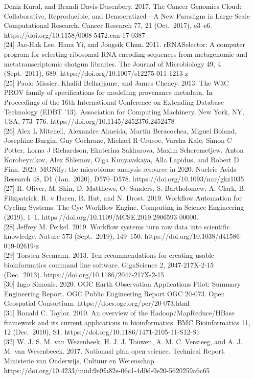 \documentclass[
]{article}
\begin{document}
Deniz Kural, and Brandi Davis-Dusenbery. 2017. The Cancer Genomics
Cloud: Collaborative, Reproducible, and Democratized---A New Paradigm in
Large-Scale Computational Research. Cancer Research 77, 21 (Oct.~2017),
e3--e6. https://doi.org/10.1158/0008-5472.can-17-0387\\
{[}24{]} Jae-Hak Lee, Hana Yi, and Jongsik Chun. 2011. rRNASelector: A
computer program for selecting ribosomal RNA encoding sequences from
metagenomic and metatranscriptomic shotgun libraries. The Journal of
Microbiology 49, 4 (Sept.~2011), 689.
https://doi.org/10.1007/s12275-011-1213-z\\
{[}25{]} Paolo Missier, Khalid Belhajjame, and James Cheney. 2013. The
W3C PROV family of specifications for modelling provenance metadata. In
Proceedings of the 16th International Conference on Extending Database
Technology (EDBT '13). Association for Computing Machinery, New York,
NY, USA, 773--776. https://doi.org/10.1145/2452376.2452478\\
{[}26{]} Alex L Mitchell, Alexandre Almeida, Martin Beracochea, Miguel
Boland, Josephine Burgin, Guy Cochrane, Michael R Crusoe, Varsha Kale,
Simon C Potter, Lorna J Richardson, Ekaterina Sakharova, Maxim
Scheremetjew, Anton Korobeynikov, Alex Shlemov, Olga Kunyavskaya, Alla
Lapidus, and Robert D Finn. 2020. MGNify: the microbiome analysis
resource in 2020. Nucleic Acids Research 48, D1 (Jan.~2020), D570--D578.
https://doi.org/10.1093/nar/gkz1035\\
{[}27{]} H. Oliver, M. Shin, D. Matthews, O. Sanders, S. Bartholomew, A.
Clark, B. Fitzpatrick, R. v Haren, R. Hut, and N. Drost. 2019. Workflow
Automation for Cycling Systems: The Cyc Workflow Engine. Computing in
Science Engineering (2019), 1--1.
https://doi.org/10.1109/MCSE.2019.2906593 00000.\\
{[}28{]} Jeffrey M. Perkel. 2019. Workflow systems turn raw data into
scientific knowledge. Nature 573 (Sept.~2019), 149--150.
https://doi.org/10.1038/d41586-019-02619-z\\
{[}29{]} Torsten Seemann. 2013. Ten recommendations for creating usable
bioinformatics command line software. GigaScience 2, 2047-217X-2-15
(Dec.~2013). https://doi.org/10.1186/2047-217X-2-15\\
{[}30{]} Ingo Simonis. 2020. OGC Earth Observation Applications Pilot:
Summary Engineering Report. OGC Public Engineering Report OGC 20-073.
Open Geospatial Consortium. https://docs.ogc.org/per/20-073.html\\
{[}31{]} Ronald C. Taylor. 2010. An overview of the
Hadoop/MapReduce/HBase framework and its current applications in
bioinformatics. BMC Bioinformatics 11, 12 (Dec.~2010), S1.
https://doi.org/10.1186/1471-2105-11-S12-S1\\
{[}32{]} W. J. S. M. van Wezenbeek, H. J. J. Touwen, A. M. C. Versteeg,
and A. J. M. van Wesenbeeck. 2017. Nationaal plan open science.
Technical Report. Ministerie van Onderwijs, Cultuur en Wetenschap.
https://doi.org/10.4233/uuid:9e9fa82e-06c1-4d0d-9e20-5620259a6c65
\end{document}
